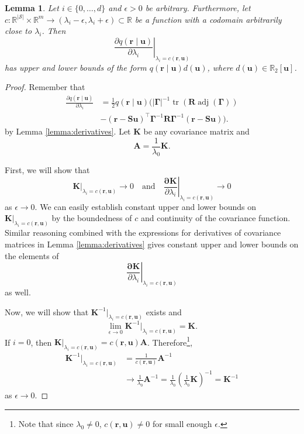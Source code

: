 \documentclass{mpaper}
\newtheorem{lemma}[theorem]{Lemma}
\DeclareMathOperator{\adj}{adj}
\DeclareMathOperator{\tr}{tr}
\begin{document}
\begin{lemma} \label{lemma:bound1}
  Let $i \in \{ 0, \dots, d \}$ and $\epsilon > 0$ be arbitrary. Furthermore,
  let $c : \mathbb{R}^{|\mathcal{S}|} \times \mathbb{R}^m \to (\lambda_i -
  \epsilon, \lambda_i + \epsilon) \subset \mathbb{R}$ be a function with a
  codomain arbitrarily close to $\lambda_i$. Then
  \[
    \left. \frac{\partial q(\mathbf{r} \mid \mathbf{u})}{\partial \lambda_i}
    \right|_{\lambda_i = c(\mathbf{r}, \mathbf{u})}
  \]
  has upper and lower bounds of the form $q(\mathbf{r} \mid
  \mathbf{u})d(\mathbf{u})$, where $d(\mathbf{u}) \in \mathbb{R}_2[\mathbf{u}]$.
\end{lemma}
\begin{proof}
  Remember that
  \begin{align*}
    \frac{\partial q(\mathbf{r} \mid \mathbf{u})}{\partial \lambda_i} &= \frac{1}{2}q(\mathbf{r} \mid \mathbf{u}) (|\bm\Gamma|^{-1} \tr(\mathbf{R} \adj(\bm\Gamma)) \\
                                                                      &- (\mathbf{r} - \mathbf{Su})^\intercal\bm\Gamma^{-1}\mathbf{R}\bm\Gamma^{-1}(\mathbf{r} - \mathbf{Su})).
  \end{align*}
  by Lemma \ref{lemma:derivatives}. Let $\mathbf{K}$ be any covariance
  matrix and
  \[
    \mathbf{A} = \frac{1}{\lambda_0} \mathbf{K}.
  \]

  First, we will show that
  \[
    \mathbf{K}|_{\lambda_i = c(\mathbf{r}, \mathbf{u})} \to 0 \quad \text{and}
    \quad \left. \frac{\mathbf{\partial K}}{\partial \lambda_i}
    \right|_{\lambda_i = c(\mathbf{r}, \mathbf{u})} \to 0
  \]
  as $\epsilon \to 0$.
  We can easily establish constant upper and lower bounds on
  $\mathbf{K}|_{\lambda_i = c(\mathbf{r}, \mathbf{u})}$ by the boundedness of
  $c$ and continuity of the covariance function. Similar reasoning combined with
  the expressions for derivatives of covariance matrices in Lemma
  \ref{lemma:derivatives} gives constant upper and lower bounds on the elements
  of
  \[
    \left. \frac{\mathbf{\partial K}}{\partial \lambda_i} \right|_{\lambda_i =
      c(\mathbf{r}, \mathbf{u})}
  \]
  as well.

  Now, we will show that $\mathbf{K}^{-1}|_{\lambda_i = c(\mathbf{r},
    \mathbf{u})}$ exists and
  \[
    \lim_{\epsilon \to 0} \mathbf{K}^{-1}|_{\lambda_i = c(\mathbf{r},
      \mathbf{u})} = \mathbf{K}.
  \]
  If $i = 0$, then $\mathbf{K}|_{\lambda_i = c(\mathbf{r}, \mathbf{u})} =
  c(\mathbf{r}, \mathbf{u})\mathbf{A}$. Therefore\footnote{Note that since
    $\lambda_0 \ne 0$, $c(\mathbf{r}, \mathbf{u}) \ne 0$ for small enough
    $\epsilon$.},
  \begin{align*}
    \mathbf{K}^{-1}|_{\lambda_i = c(\mathbf{r}, \mathbf{u})} &=
                                                               \frac{1}{c(\mathbf{r}, \mathbf{u})}\mathbf{A}^{-1} \\
                                                             &\to \frac{1}{\lambda_0}\mathbf{A}^{-1} = \frac{1}{\lambda_0} \left( \frac{1}{\lambda_0}\mathbf{K} \right)^{-1} = \mathbf{K}^{-1}
  \end{align*}
  as $\epsilon \to 0$.


\end{proof}
\end{document}
